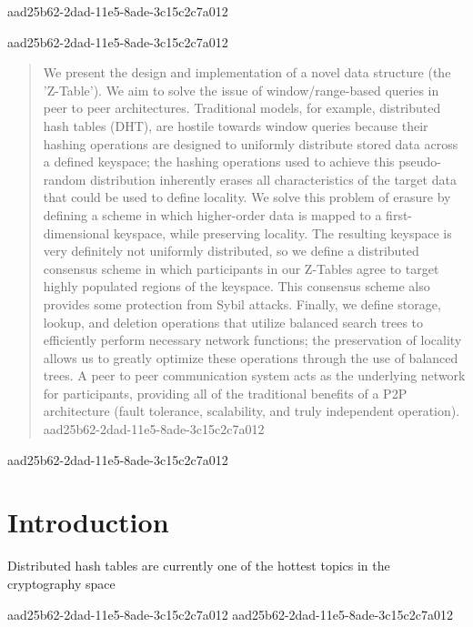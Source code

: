 \documentclass[12pt]{article}
\begin{document}
aad25b62-2dad-11e5-8ade-3c15c2c7a012\maketitle
aad25b62-2dad-11e5-8ade-3c15c2c7a012
\begin{abstract}
We present the design and implementation of a novel data structure (the 'Z-Table'). We aim to solve the issue of window/range-based queries in peer to peer architectures. Traditional models, for example,  distributed hash tables (DHT), are hostile towards window queries because their hashing operations are designed to uniformly distribute stored data across a defined keyspace; the hashing operations used to achieve this pseudo-random distribution inherently erases all characteristics of the target data that could be used to define locality. We solve this problem of erasure by defining a scheme in which higher-order data is mapped to a first-dimensional keyspace, while preserving locality. The resulting keyspace is very definitely not uniformly distributed, so we define a distributed consensus scheme in which participants in our Z-Tables agree to target highly populated regions of the keyspace. This consensus scheme also provides some protection from Sybil attacks. Finally, we define storage, lookup, and deletion operations that utilize balanced search trees to efficiently perform necessary network functions; the preservation of locality allows us to greatly optimize these operations through the use of balanced trees. A peer to peer communication system acts as the underlying network for participants, providing all of the traditional benefits of a P2P architecture (fault tolerance, scalability, and truly independent operation).
aad25b62-2dad-11e5-8ade-3c15c2c7a012\end{abstract}


aad25b62-2dad-11e5-8ade-3c15c2c7a012\newpage
\section{Introduction}
Distributed hash tables are currently one of the hottest topics in the cryptography space~\cite{Stoica:2001dj,Rowstron:2001ea,Ratnasamy:2001wn}

aad25b62-2dad-11e5-8ade-3c15c2c7a012\printbibliography
aad25b62-2dad-11e5-8ade-3c15c2c7a012
\end{document}
